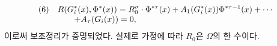 
\[
\begin{array}{@{}l@{\quad}l@{}}
(6)& \displaystyle R(G_i^*(x),\Phi^*(x))=R_0^\sigma\cdot\Phi^{*\tau}(x)+A_1(G_i^*(x))\Phi^{*\tau-1}(x)+\cdots\\
& \displaystyle\qquad +A_\tau(G_i(x))=0,
\end{array}
\]
이로써 보조정리가 증명되었다. 실제로 가정에 따라 $R_0$은 $\Omega$의 한 수이다.
